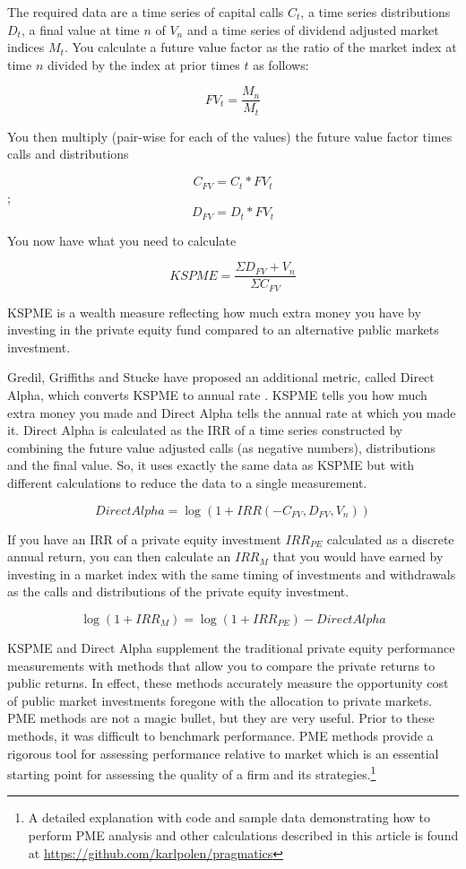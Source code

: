 \documentclass[12pt,english]{article}\usepackage[]{graphicx}\usepackage[]{color}
\begin{document}
The required data are a time series of capital calls $C_t$, a time
series distributions $D_t$, a final value at time $n$ of $V_n$
and a time series of dividend adjusted market indices $M_t$. You
calculate a future value factor as the ratio of the market index at
time $n$ divided by the index at prior times $t$ as follows:

$$FV_t=\frac{M_n}{M_t}$$

You then multiply (pair-wise for each of the values) the future value
factor times calls and distributions 

$$C_{FV}=C_t * FV_t$$ ; $$D_{FV} = D_t * FV_t$$ 

You now have what you need to calculate

$$KSPME = \frac{\Sigma D_{FV} + V_n}{\Sigma C_{FV}}$$ 

KSPME is a wealth measure reflecting how much extra money you have
by investing in the private equity fund compared to an alternative
public markets investment.

Gredil, Griffiths and Stucke have proposed an additional metric, called
\textquotedbl Direct Alpha\textquotedbl , which converts KSPME to
annual rate \parencite{Gredil2014}. KSPME tells you how much extra
money you made and Direct Alpha tells the annual rate at which you
made it. Direct Alpha is calculated as the IRR of a time series constructed
by combining the future value adjusted calls (as negative numbers),
distributions and the final value. So, it uses exactly the same data
as KSPME but with different calculations to reduce the data to a single
measurement. 

$$Direct Alpha = \log{(1+IRR(-C_{FV},D_{FV},V_n))}$$

If you have an IRR of a private equity investment $IRR_{PE}$ calculated
as a discrete annual return, you can then calculate an $IRR_M$ that
you would have earned by investing in a market index with the same
timing of investments and withdrawals as the calls and distributions
of the private equity investment. 

$$\log{(1+IRR_M)} = \log{(1+IRR_{PE})} - DirectAlpha$$

KSPME and Direct Alpha supplement the traditional private equity performance
measurements with methods that allow you to compare the private returns
to public returns. In effect, these methods accurately measure the
opportunity cost of public market investments foregone with the allocation
to private markets. PME methods are not a magic bullet, but they are
very useful. Prior to these methods, it was difficult to benchmark
performance. PME methods provide a rigorous tool for assessing performance
relative to market which is an essential starting point for assessing
the quality of a firm and its strategies.\footnote{A detailed explanation with code and sample data demonstrating how
to perform PME analysis and other calculations described in this article
is found at \href{https://github.com/karlpolen/pragmatics}{https://github.com/karlpolen/pragmatics}}
\end{document}
